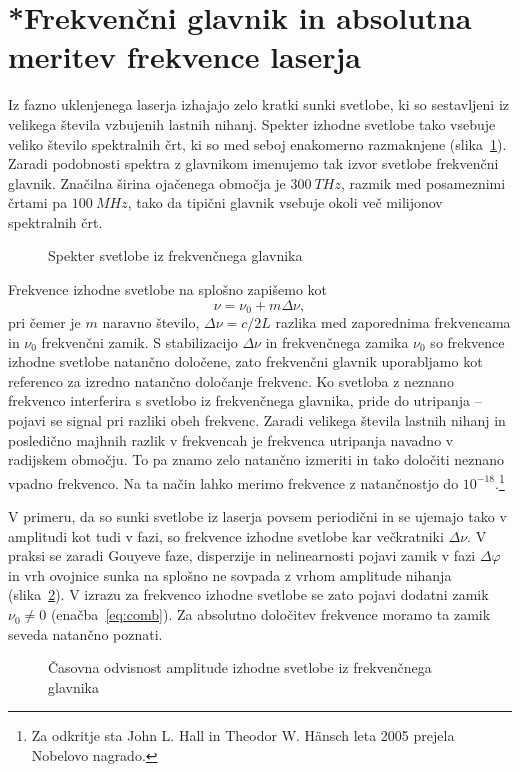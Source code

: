 \section{*Frekvenčni glavnik in absolutna meritev frekvence laserja}
Iz fazno uklenjenega laserja izhajajo zelo kratki sunki svetlobe, ki 
so sestavljeni iz velikega števila vzbujenih lastnih nihanj. Spekter 
izhodne svetlobe tako vsebuje veliko število spektralnih črt, ki
so med seboj enakomerno razmaknjene (slika~\ref{fig:comb}). Zaradi podobnosti spektra
z glavnikom imenujemo tak izvor svetlobe frekvenčni glavnik. Značilna širina ojačenega
območja je $300~\si{THz}$, razmik med posameznimi črtami pa $100~\si{MHz}$, tako 
da tipični glavnik vsebuje okoli več milijonov spektralnih črt.
\begin{figure}[h]
\centering
\def\svgwidth{110truemm} 

\caption{Spekter svetlobe iz frekvenčnega glavnika}
\label{fig:comb}
\end{figure}

Frekvence izhodne svetlobe na splošno zapišemo kot 
\begin{equation}
\nu = \nu_0 + m\Delta \nu,
\label{eq:comb}
\end{equation}
pri čemer je $m$ naravno število, $\Delta \nu = c/2L$ razlika med zaporednima 
frekvencama in $\nu_0$ frekvenčni zamik. S stabilizacijo $\Delta \nu$ in 
frekvenčnega zamika $\nu_0$ so frekvence izhodne svetlobe  
natančno določene, zato frekvenčni glavnik uporabljamo kot referenco 
za izredno natančno določanje frekvenc. Ko svetloba z neznano frekvenco
interferira s svetlobo iz frekvenčnega glavnika, pride do utripanja -- pojavi
se signal pri razliki obeh frekvenc. Zaradi velikega števila lastnih nihanj 
in posledično majhnih razlik v frekvencah je frekvenca utripanja navadno v 
radijskem območju. To pa znamo zelo natančno izmeriti in tako določiti neznano 
vpadno frekvenco. Na ta način lahko merimo frekvence z natančnostjo do 
$10^{-18}$.\footnote{Za odkritje 
sta John L. Hall in Theodor W. H\"ansch leta 2005 prejela 
Nobelovo nagrado.} 

V primeru, da so sunki svetlobe iz laserja povsem periodični in se ujemajo tako
v amplitudi kot tudi v fazi, so frekvence izhodne svetlobe kar 
večkratniki $\Delta \nu$. V praksi se zaradi Gouyeve faze,
disperzije in nelinearnosti pojavi zamik
v fazi $\Delta \varphi$ in vrh ovojnice sunka na splošno ne sovpada z vrhom amplitude
nihanja (slika~\ref{fig:comb2}). V izrazu za
frekvenco izhodne svetlobe se zato pojavi dodatni zamik $\nu_0 \neq 0$ (enačba~\ref{eq:comb}). 
Za absolutno
določitev frekvence moramo ta zamik seveda natančno poznati. 
\begin{figure}[h]
\centering
\def\svgwidth{110truemm} 

\caption{Časovna odvisnost amplitude izhodne svetlobe iz frekvenčnega glavnika}
\label{fig:comb2}
\end{figure}

